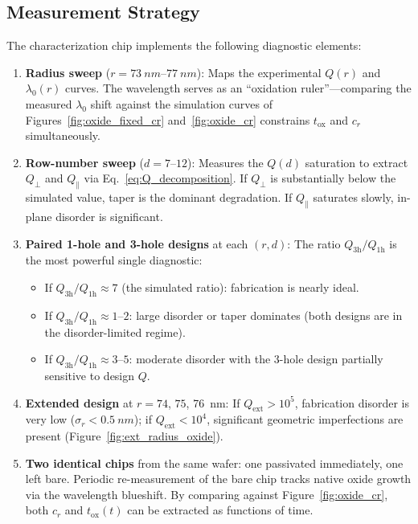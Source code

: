 \documentclass[11pt,a4paper]{article}
\begin{document}
\subsection{Measurement Strategy}
\label{sec:strategy}

The characterization chip implements the following diagnostic elements:

\begin{enumerate}
  \item \textbf{Radius sweep} ($r = \SIrange{73}{77}{nm}$): Maps the experimental $Q(r)$ and $\lambda_0(r)$ curves. The wavelength serves as an ``oxidation ruler''---comparing the measured $\lambda_0$ shift against the simulation curves of Figures~\ref{fig:oxide_fixed_cr} and~\ref{fig:oxide_cr} constrains $t_\mathrm{ox}$ and $c_r$ simultaneously.

  \item \textbf{Row-number sweep} ($d = 7$--$12$): Measures the $Q(d)$ saturation to extract $Q_\perp$ and $Q_\parallel$ via Eq.~\ref{eq:Q_decomposition}. If $Q_\perp$ is substantially below the simulated value, taper is the dominant degradation. If $Q_\parallel$ saturates slowly, in-plane disorder is significant.

  \item \textbf{Paired 1-hole and 3-hole designs} at each $(r, d)$: The ratio $Q_\mathrm{3h}/Q_\mathrm{1h}$ is the most powerful single diagnostic:
  \begin{itemize}
    \item If $Q_\mathrm{3h}/Q_\mathrm{1h} \approx 7$ (the simulated ratio): fabrication is nearly ideal.
    \item If $Q_\mathrm{3h}/Q_\mathrm{1h} \approx 1$--$2$: large disorder or taper dominates (both designs are in the disorder-limited regime).
    \item If $Q_\mathrm{3h}/Q_\mathrm{1h} \approx 3$--$5$: moderate disorder with the 3-hole design partially sensitive to design $Q$.
  \end{itemize}

  \item \textbf{Extended design} at $r = 74$, $75$, \SI{76}{nm}: If $Q_\mathrm{ext} > 10^5$, fabrication disorder is very low ($\sigma_r < \SI{0.5}{nm}$); if $Q_\mathrm{ext} < 10^4$, significant geometric imperfections are present (Figure~\ref{fig:ext_radius_oxide}).

  \item \textbf{Two identical chips} from the same wafer: one passivated immediately, one left bare. Periodic re-measurement of the bare chip tracks native oxide growth via the wavelength blueshift. By comparing against Figure~\ref{fig:oxide_cr}, both $c_r$ and $t_\mathrm{ox}(t)$ can be extracted as functions of time.
\end{enumerate}
\end{document}
